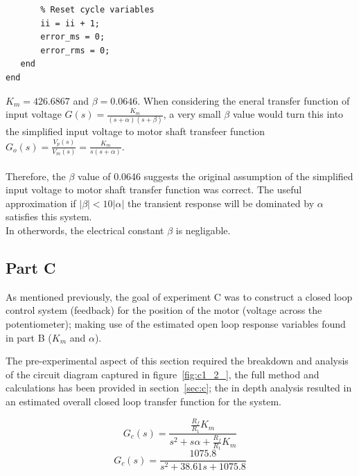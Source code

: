 \documentclass[11pt,a4paper]{article}
\begin{document}
\begin{enumerate}
\begin{lstlisting}
       % Reset cycle variables
       ii = ii + 1;
       error_ms = 0;
       error_rms = 0;
   end
end	
	\end{lstlisting}
	$K_m = 426.6867$ and $\beta = 0.0646$. When considering the eneral transfer function of input voltage $G(s) = \frac{K_m}{(s+\alpha)(s+\beta)}$, a very small $\beta$ value would turn this into the simplified input voltage to motor shaft transfeer function $G_o(s) = \frac{V_p(s)}{V_m(s)} = \frac{K_m}{s(s + \alpha)}$.\\\\
	Therefore, the $\beta$ value of 0.0646 suggests the original assumption of the simplified input voltage to motor shaft transfer function was correct. The useful approximation if $|\beta| < 10|\alpha|$ the transient response will be dominated by $\alpha$ satisfies this system.\\
	In otherwords, the electrical constant $\beta$ is negligable. 



\end{enumerate}








\pagebreak
\subsection{Part C}
As mentioned previously, the goal of experiment C was to construct a closed loop control system (feedback) for the position of the motor (voltage across the potentiometer); making use of the estimated open loop response variables found in part B ($K_m$ and $\alpha$). 

The pre-experimental aspect of this section required the breakdown and analysis of the circuit diagram captured in figure~\ref{fig:c1_2_}, the full method and calculations has been provided in section~\ref{sec:c}; the in depth analysis resulted in an estimated overall closed loop transfer function for the system. 

$$ G_c(s) = \frac{\frac{R_f}{R_1}K_m} {s^2 + s\alpha + \frac{R_f}{R_1}K_m} $$
$$ G_c(s) = \frac{1075.8} {s^2 + 38.61s + 1075.8} $$\\

\end{document}
